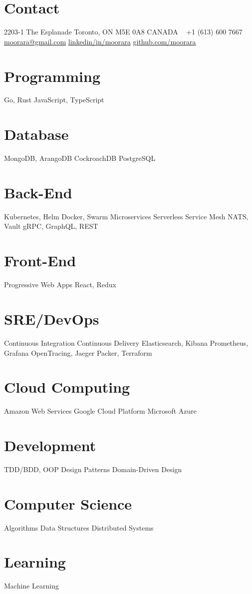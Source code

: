 \documentclass[]{cv-style}                     %
\begin{document}
\lastupdated



\begin{aside}
%
\section{Contact}
2203-1 The Esplanade
Toronto, ON  M5E 0A8
CANADA
~
+1 (613) 600 7667
~
\href{mailto:moorara@gmail.com}{moorara@gmail.com}
\href{http://linkedin.com/in/moorara}{linkedin/in/moorara}
\href{http://github.com/moorara}{github.com/moorara}
%
\section{Programming}
Go, Rust
JavaScript, TypeScript
%
\section{Database}
MongoDB, ArangoDB
CockroachDB
PostgreSQL
%
\section{Back-End}
Kubernetes, Helm
Docker, Swarm
Microservices
Serverless
Service Mesh
NATS, Vault
gRPC, GraphQL, REST
%
\section{Front-End}
Progressive Web Apps
React, Redux
%
\section{SRE/DevOps}
Continuous Integration
Continuous Delivery
Elasticsearch, Kibana
Prometheus, Grafana
OpenTracing, Jaeger
Packer, Terraform
%
\section{Cloud Computing}
Amazon Web Services
Google Cloud Platform
Microsoft Azure
%
\section{Development}
TDD/BDD, OOP
Design Patterns
Domain-Driven Design
%
\section{Computer Science}
Algorithms
Data Structures
Distributed Systems
%
\section{Learning}
Machine Learning
%
\end{aside}
\end{document}
